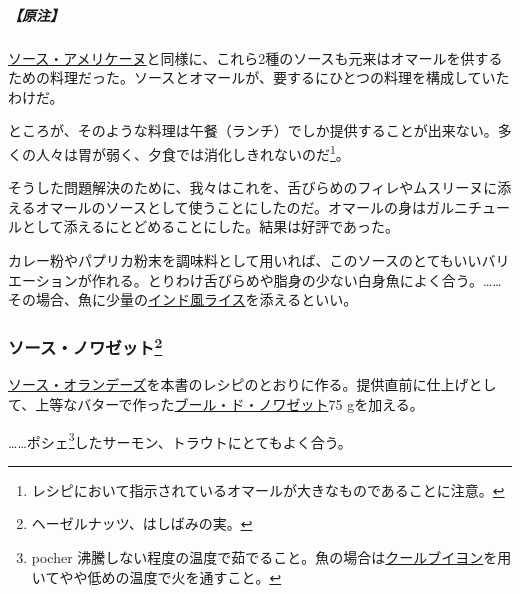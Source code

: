 \begin{recette}
\hypertarget{nota-sauce-new-burg-b}{%
\subparagraph{【原注】}\label{nota-sauce-new-burg-b}}

\protect\hyperlink{sauce-americaine}{ソース・アメリケーヌ}と同様に、これら2種のソースも元来はオマールを供するための料理だった。ソースとオマールが、要するにひとつの料理を構成していたわけだ。

ところが、そのような料理は午餐（ランチ）でしか提供することが出来ない。多くの人々は胃が弱く、夕食では消化しきれないのだ\footnote{レシピにおいて指示されているオマールが大きなものであることに注意。}。

そうした問題解決のために、我々はこれを、舌びらめのフィレやムスリーヌに添えるオマールのソースとして使うことにしたのだ。オマールの身はガルニチュールとして添えるにとどめることにした。結果は好評であった。

カレー粉やパプリカ粉末を調味料として用いれば、このソースのとてもいいバリエーションが作れる。とりわけ舌びらめや脂身の少ない白身魚によく合う。\ldots{}\ldots{}その場合、魚に少量の\protect\hyperlink{riz-indienne}{インド風ライス}を添えるといい。

\hypertarget{sauce-noisette}{%
\subsubsection[ソース・ノワゼット]{\texorpdfstring{ソース・ノワゼット\footnote{ヘーゼルナッツ、はしばみの実。}}{ソース・ノワゼット}}\label{sauce-noisette}}



\protect\hyperlink{sauce-hollandaise}{ソース・オランデーズ}を本書のレシピのとおりに作る。提供直前に仕上げとして、上等なバターで作った\protect\hyperlink{beurre-de-noisette}{ブール・ド・ノワゼット}75
gを加える。

\ldots{}\ldots{}ポシェ\footnote{pocher
  沸騰しない程度の温度で茹でること。魚の場合は\protect\hyperlink{court-bouillon-a}{クールブイヨン}を用いてやや低めの温度で火を通すこと。}したサーモン、トラウトにとてもよく合う。

\hypertarget{sauce-normande}{%
}
\end{recette}
